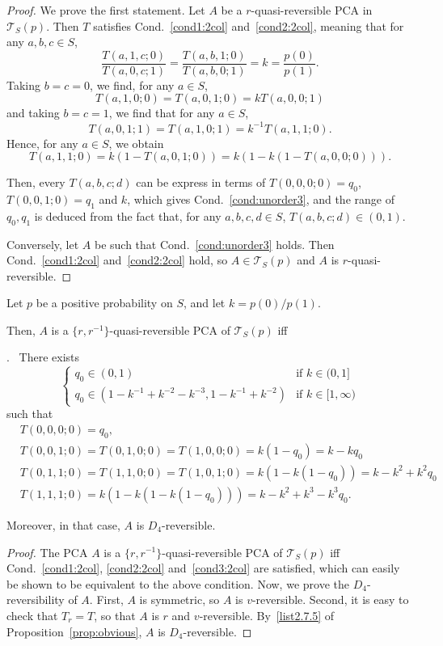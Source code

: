 \documentclass[10pt]{amsart}
\theoremstyle{definition}\newtheorem{defi}[theo]{Definition}\newtheorem{rema}[theo]{Remark}\newtheorem{exam}[theo]{Example}\newtheorem{exem}[theo]{Example}\newtheorem{nota}[theo]{Notation}
\newcounter{a}
\newcommand{\Cond}{Cond.}
\newenvironment{cond}{\refstepcounter{a}{\upshape\emph{Cond.~\thea}}\pointir}{}
\newcommand{\triang}[2]{\mathcal{T}_{#1} \left(#2 \right)}
\providecommand{\pointir}{.\ }
\begin{document}
\begin{proof}
We prove the first statement. Let $A$ be a $r$-quasi-reversible PCA in $\triang{S}{p}$.
Then $T$ satisfies \Cond~\ref{cond1:2col} and~\ref{cond2:2col}, meaning that for any $a,b,c \in S$,
\[
\frac{T(a,1,c;0)}{T(a,0,c;1)} = \frac{T(a,b,1;0)}{T(a,b,0;1)} = k = \frac{p(0)}{p(1)}.
\]
Taking $b=c=0$, we find, for any $a \in S$,
\[
T(a,1,0;0) = T(a,0,1;0) = k T(a,0,0;1)
\]
and taking $b=c=1$, we find that for any $a \in S$,
\[
T(a,0,1;1) = T(a,1,0;1) = k^{-1} T(a,1,1;0).
\]
Hence, for any $a \in S$, we obtain
\[
T(a,1,1;0) = k (1-T(a,0,1;0)) = k (1 - k (1-T(a,0,0;0))).
\]

Then, every $T(a,b,c;d)$ can be express in terms of $T(0,0,0;0) =q_0$, $T(0,0,1;0) =q_1$ and $k$, which gives \Cond~\ref{cond:unorder3}, and the range of $q_0,q_1$ is deduced from the fact that, for any $a,b,c,d \in S$, $T(a,b,c;d) \in (0,1)$.

Conversely, let $A$ be such that \Cond~\ref{cond:unorder3} holds. Then \Cond~\ref{cond1:2col} and~\ref{cond2:2col} hold, so $A \in \triang{S}{p}$ and $A$ is $r$-quasi-reversible.
\end{proof}

\begin{prop}\label{theo:drev2col}
Let $p$ be a positive probability on $S$, and let $k=p(0)/p(1)$.

Then, $A$ is a $\{r,r^{-1}\}$-quasi-reversible PCA of $\triang{S}{p}$ iff

\textnormal{\begin{cond} \label{cond:unorder2}
There exists
\[
\begin{cases}
q_0 \in (0,1) & \text{if } k \in (0,1]\\
q_0 \in (1-k^{-1}+k^{-2}-k^{-3},1-k^{-1}+k^{-2}) & \text{if } k \in [1,\infty)
\end{cases}
\]
such that
\begin{align*}
&T(0,0,0;0) = q_0,\\
&T(0,0,1;0) = T(0,1,0;0) = T(1,0,0;0) = k (1-q_0) = k-kq_0\\
&T(0,1,1;0) = T(1,1,0;0) = T(1,0,1;0) = k (1-k(1-q_0)) = k-k^2+k^2q_0\\
&T(1,1,1;0) = k(1-k(1-k(1-q_0))) = k -k^2 + k^3 -k^3q_0.
\end{align*}
\end{cond}}

Moreover, in that case, $A$ is $D_4$-reversible.
\end{prop}

\begin{proof}
The PCA $A$ is a $\{r,r^{-1}\}$-quasi-reversible PCA of $\triang{S}{p}$ iff \Cond~\ref{cond1:2col}, \ref{cond2:2col} and~\ref{cond3:2col} are satisfied, which can easily be shown to be equivalent to the above condition.
Now, we prove the $D_4$-reversibility of $A$. First, $A$ is symmetric, so $A$ is $v$-reversible. Second, it is easy to check that $T_r=T$, so that $A$ is $r$ and $v$-reversible. By~\eqref{list2.7.5} of Proposition~\ref{prop:obvious}, $A$ is $D_4$-reversible.
\end{proof}
\end{document}
